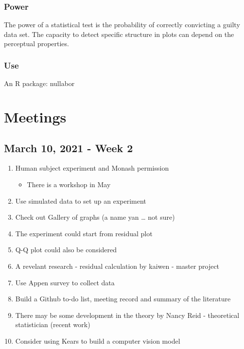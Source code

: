\documentclass[
]{book}
\providecommand{\tightlist}{%
  \setlength{\itemsep}{0pt}\setlength{\parskip}{0pt}}
\begin{document}
\hypertarget{power}{%
\subsection{Power}\label{power}}

The power of a statistical test is the probability of correctly convicting a guilty data set. The capacity to detect specific structure in plots can depend on the perceptual properties.

\hypertarget{use}{%
\subsection{Use}\label{use}}

An R package: nullabor

\hypertarget{meetings}{%
\chapter{Meetings}\label{meetings}}

\hypertarget{march-10-2021---week-2}{%
\section{March 10, 2021 - Week 2}\label{march-10-2021---week-2}}

\begin{enumerate}
\def\labelenumi{\arabic{enumi}.}
\tightlist
\item
  Human subject experiment and Monash permission

  \begin{itemize}
  \tightlist
  \item
    There is a workshop in May
  \end{itemize}
\item
  Use simulated data to set up an experiment
\item
  Check out Gallery of graphs (a name yan \ldots{} not sure)
\item
  The experiment could start from residual plot
\item
  Q-Q plot could also be considered
\item
  A revelant research - residual calculation by kaiwen - master project
\item
  Use Appen survey to collect data
\item
  Build a Github to-do list, meeting record and summary of the literature
\item
  There may be some development in the theory by Nancy Reid - theoretical statistician (recent work)
\item
  Consider using Kears to build a computer vision model
\end{enumerate}
\end{document}
